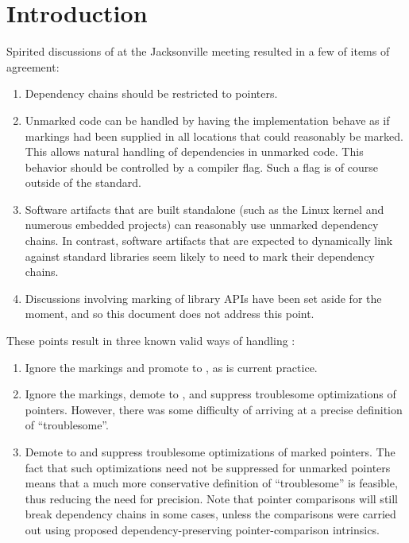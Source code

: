 \documentclass[letterpaper,twocolumn,10pt]{article}
\begin{document}
\section{Introduction}
\label{sec:Introduction}

Spirited discussions of 
at the Jacksonville meeting resulted in a few of items of agreement:

\begin{enumerate}
\item	Dependency chains should be restricted to pointers.
\item	Unmarked code can be handled by having the implementation
	behave as if markings had been supplied in all locations that
	could reasonably be marked.
	This allows natural handling of dependencies in unmarked code.
	This behavior should be controlled by a compiler flag.
	Such a flag is of course outside of the standard.
\item	Software artifacts that are built standalone (such as the Linux
	kernel and numerous embedded projects) can reasonably use
	unmarked dependency chains.
	In contrast, software artifacts that are expected to dynamically link
	against standard libraries seem likely to need to mark their
	dependency chains.
\item	Discussions involving marking of library APIs have been
	set aside for the moment, and so this document does not address
	this point.
\end{enumerate}

These points result in three known valid ways of handling
:

\begin{enumerate}
\item	Ignore the markings and promote 
	to , as is current practice.
\item	Ignore the markings, demote  to
	, and suppress troublesome
	optimizations of pointers.
	However, there was some difficulty of arriving at a precise
	definition of ``troublesome''.
\item	Demote  to 
	and suppress troublesome optimizations of marked pointers.
	The fact that such optimizations need not be suppressed
	for unmarked pointers means that a much more conservative
	definition of ``troublesome'' is feasible, thus reducing
	the need for precision.
	Note that pointer comparisons will still break dependency chains
	in some cases, unless the comparisons were carried out using
	proposed dependency-preserving pointer-comparison intrinsics.
\end{enumerate}
\end{document}
